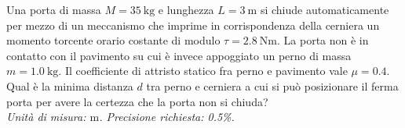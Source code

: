 \documentclass[a4paper,12pt]{article}
\begin{document}
\begin{minipage}[c]{0.75\textwidth}
Una porta di massa $M = \SI{35}{\kilo\gram}$ e lunghezza $L = \SI{3}{\meter}$ si chiude automaticamente per mezzo di un meccanismo che imprime in corrispondenza della cerniera un momento torcente orario costante di modulo $\tau = \SI{2.8}{\newton\meter}$. La porta non è in contatto con il pavimento su cui è invece appoggiato un perno di massa $m = \SI{1.0}{\kilo\gram}$. Il coefficiente di attristo statico fra perno e pavimento vale $\mu = 0.4$. Qual è la minima distanza $d$ tra perno e cerniera a cui si può posizionare il ferma porta per avere la certezza che la porta non si chiuda? \\

\textit{Unità di misura: $\si{\meter}$. Precisione richiesta: 0.5\%.}


\end{minipage}
\hfill
\begin{minipage}[c]{0.25\textwidth}
\center
{}
\end{minipage}
\end{document}
